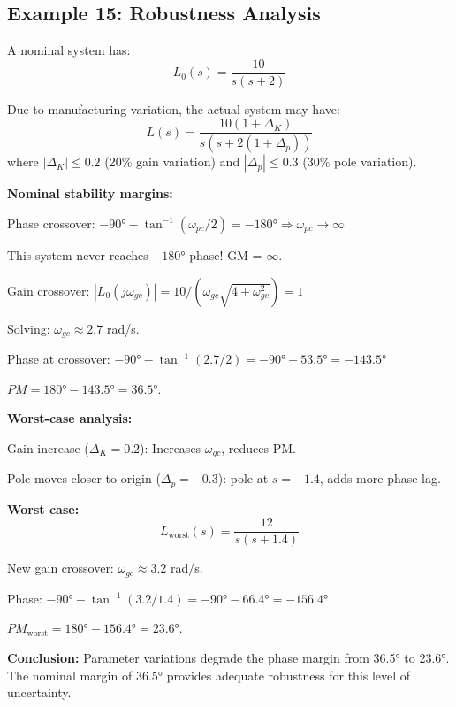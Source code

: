 \subsection{Example 15: Robustness Analysis}

\begin{example}
\label{ex:robustness}
A nominal system has:
\begin{equation}
L_0(s) = \frac{10}{s(s+2)}
\end{equation}

Due to manufacturing variation, the actual system may have:
\begin{equation}
L(s) = \frac{10(1+\Delta_K)}{s(s+2(1+\Delta_p))}
\end{equation}
where $|\Delta_K| \leq 0.2$ (20\% gain variation) and $|\Delta_p| \leq 0.3$ (30\% pole variation).

\textbf{Nominal stability margins:}

Phase crossover: $-90° - \tan^{-1}(\omega_{pc}/2) = -180° \Rightarrow \omega_{pc} \to \infty$

This system never reaches $-180°$ phase! GM = $\infty$.

Gain crossover: $|L_0(j\omega_{gc})| = 10/(\omega_{gc}\sqrt{4+\omega_{gc}^2}) = 1$

Solving: $\omega_{gc} \approx 2.7$ rad/s.

Phase at crossover: $-90° - \tan^{-1}(2.7/2) = -90° - 53.5° = -143.5°$

$PM = 180° - 143.5° = 36.5°$.

\textbf{Worst-case analysis:}

Gain increase ($\Delta_K = 0.2$): Increases $\omega_{gc}$, reduces PM.

Pole moves closer to origin ($\Delta_p = -0.3$): pole at $s = -1.4$, adds more phase lag.

\textbf{Worst case:}
\begin{equation}
L_{\text{worst}}(s) = \frac{12}{s(s+1.4)}
\end{equation}

New gain crossover: $\omega_{gc} \approx 3.2$ rad/s.

Phase: $-90° - \tan^{-1}(3.2/1.4) = -90° - 66.4° = -156.4°$

$PM_{\text{worst}} = 180° - 156.4° = 23.6°$.

\textbf{Conclusion:} Parameter variations degrade the phase margin from 36.5° to 23.6°. The nominal margin of 36.5° provides adequate robustness for this level of uncertainty.
\end{example}

